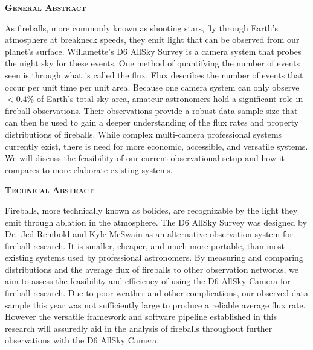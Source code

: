 \begin{flushleft}

\textbf{\textsc{\LARGE General Abstract}}

\vspace{0.2 in}

As fireballs, more commonly known as shooting stars, fly through Earth's atmosphere at breakneck speeds, they emit light that can be observed from our planet’s surface. 
Willamette's D6 AllSky Survey is a camera system that probes the night sky for these events.
One method of quantifying the number of events seen is through what is called the flux.
Flux describes the number of events that occur per unit time per unit area.
Because one camera system can only observe $<0.4\%$ of Earth's total sky area, amateur astronomers hold a significant role in fireball observations.
Their observations provide a robust data sample size that can then be used to gain a deeper understanding of the flux rates and property distributions of fireballs.
While complex multi-camera professional systems currently exist, there is need for more economic, accessible, and versatile systems. 
We will discuss the feasibility of our current observational setup and how it compares to more elaborate existing systems.
\vspace{0.25 in}

\textbf{\textsc{\LARGE Technical Abstract}}

\vspace{0.2 in}

Fireballs, more technically known as bolides, are recognizable by the light they emit through ablation in the atmosphere. 
The D6 AllSky Survey was designed by Dr.~Jed Rembold and Kyle McSwain as an alternative observation system for fireball research. 
It is smaller, cheaper, and much more portable, than most existing systems used by professional astronomers. 
By measuring and comparing distributions and the average flux of fireballs to other observation networks, we aim to assess the feasibility and efficiency of using the D6 AllSky Camera for fireball research.  
Due to poor weather and other complications, our observed data sample this year was not sufficiently large to produce a reliable average flux rate.
However the versatile framework and software pipeline established in this research will assuredly aid in the analysis of fireballs throughout further observations with the D6 AllSky Camera.

\end{flushleft}
